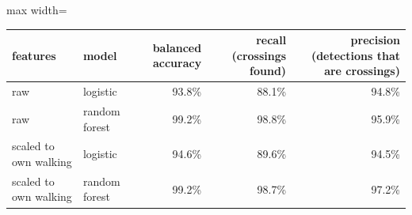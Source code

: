 \begin{adjustbox}{max width=\textwidth}
{\footnotesize
\begin{tabular}{llrrr}
\toprule
\textbf{features} & \textbf{model} & \textbf{balanced accuracy} & \textbf{recall (crossings found)} & \textbf{precision (detections that are crossings)} \\
\midrule
raw & logistic & 93.8\% & 88.1\% & 94.8\% \\
raw & random forest & 99.2\% & 98.8\% & 95.9\% \\
scaled to own walking & logistic & 94.6\% & 89.6\% & 94.5\% \\
scaled to own walking & random forest & 99.2\% & 98.7\% & 97.2\% \\
\bottomrule
\end{tabular}
}
\end{adjustbox}
